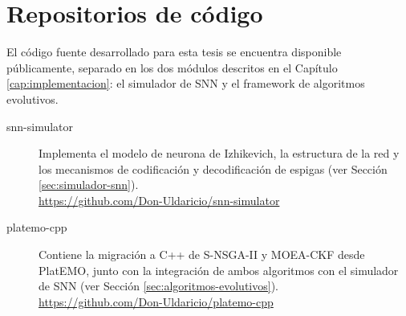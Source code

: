 \chapter{Repositorios de código}\label{chap:anexo-repos}

El código fuente desarrollado para esta tesis se encuentra disponible públicamente, separado en los dos módulos descritos en el Capítulo \ref{cap:implementacion}: el simulador de SNN y el framework de algoritmos evolutivos.

\begin{description}
    \item[snn-simulator] Implementa el modelo de neurona de Izhikevich, la estructura de la red y los mecanismos de codificación y decodificación de espigas (ver Sección \ref{sec:simulador-snn}).\\
    \url{https://github.com/Don-Uldaricio/snn-simulator}

    \item[platemo-cpp] Contiene la migración a C++ de S-NSGA-II y MOEA-CKF desde PlatEMO, junto con la integración de ambos algoritmos con el simulador de SNN (ver Sección \ref{sec:algoritmos-evolutivos}).\\
    \url{https://github.com/Don-Uldaricio/platemo-cpp}
\end{description}
